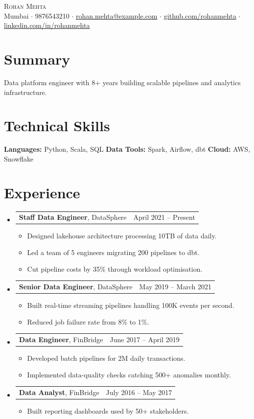 \documentclass[letterpaper,11pt]{article}
\makeatletter
\newcommand{\resumeItem}[1]{%
  \item\small{#1 \vspace{-1pt}}%
}
\newcommand{\resumeSubheading}[3]{%
  \vspace{2pt}\item
    \begin{tabular*}{\linewidth}[t]{l@{\extracolsep{\fill}}r}
      \textbf{#1}, #2 & #3 \\
    \end{tabular*}\vspace{-4pt}%
}
\newcommand{\resumeSubHeadingListStart}{\begin{itemize}[leftmargin=0.15in, label={}, parsep=0pt, topsep=0pt, itemsep=4pt]}
\newcommand{\resumeSubHeadingListEnd}{\end{itemize}}
\newcommand{\resumeItemListStart}{\begin{itemize}[leftmargin=0.15in, parsep=0pt, topsep=2pt, itemsep=3pt, label=$\bullet$]}
\newcommand{\resumeItemListEnd}{\end{itemize}\vspace{-2pt}}
\makeatother
\begin{document}
\begin{center}
{\Huge \scshape Rohan Mehta} \\ \vspace{5pt}
\small Mumbai $\cdot$ 9876543210 $\cdot$ \href{mailto:rohan.mehta@example.com}{rohan.mehta@example.com} $\cdot$ \href{https://github.com/rohanmehta}{github.com/rohanmehta} $\cdot$ \href{https://linkedin.com/in/rohanmehta}{linkedin.com/in/rohanmehta}
\end{center}

\section{Summary}
{\small Data platform engineer with 8+ years building scalable pipelines and analytics infrastructure.}

\section{Technical Skills}
\begin{itemize}[leftmargin=0.15in, label={}, parsep=0pt, topsep=0pt, itemsep=0pt]
    \small{\item{
     \textbf{Languages:} Python, Scala, SQL
     \textbf{Data Tools:} Spark, Airflow, dbt
     \textbf{Cloud:} AWS, Snowflake
    }}
\end{itemize}

\section{Experience}
\resumeSubHeadingListStart
\resumeSubheading{Staff Data Engineer}{DataSphere}{April 2021 -- Present}
\resumeItemListStart
\resumeItem{Designed lakehouse architecture processing 10TB of data daily.}
\resumeItem{Led a team of 5 engineers migrating 200 pipelines to dbt.}
\resumeItem{Cut pipeline costs by 35\% through workload optimisation.}
\resumeItemListEnd
\resumeSubheading{Senior Data Engineer}{DataSphere}{May 2019 -- March 2021}
\resumeItemListStart
\resumeItem{Built real-time streaming pipelines handling 100K events per second.}
\resumeItem{Reduced job failure rate from 8\% to 1\%.}
\resumeItemListEnd
\resumeSubheading{Data Engineer}{FinBridge}{June 2017 -- April 2019}
\resumeItemListStart
\resumeItem{Developed batch pipelines for 2M daily transactions.}
\resumeItem{Implemented data-quality checks catching 500+ anomalies monthly.}
\resumeItemListEnd
\resumeSubheading{Data Analyst}{FinBridge}{July 2016 -- May 2017}
\resumeItemListStart
\resumeItem{Built reporting dashboards used by 50+ stakeholders.}
\resumeItemListEnd
\resumeSubHeadingListEnd
\end{document}
